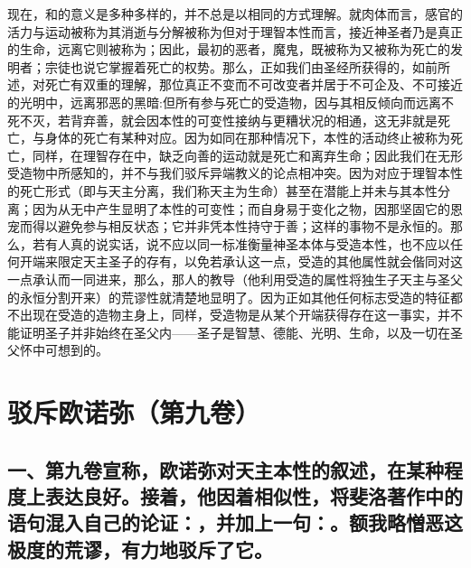 现在，和的意义是多种多样的，并不总是以相同的方式理解。就肉体而言，感官的活力与运动被称为其消逝与分解被称为但对于理智本性而言，接近神圣者乃是真正的生命，远离它则被称为；因此，最初的恶者，魔鬼，既被称为又被称为死亡的发明者；宗徒也说它掌握着死亡的权势。那么，正如我们由圣经所获得的，如前所述，对死亡有双重的理解，那位真正不变而不可改变者并居于不可企及、不可接近的光明中，远离邪恶的黑暗:但所有参与死亡的受造物，因与其相反倾向而远离不死不灭，若背弃善，就会因本性的可变性接纳与更糟状况的相通，这无非就是死亡，与身体的死亡有某种对应。因为如同在那种情况下，本性的活动终止被称为死亡，同样，在理智存在中，缺乏向善的运动就是死亡和离弃生命；因此我们在无形受造物中所感知的，并不与我们驳斥异端教义的论点相冲突。因为对应于理智本性的死亡形式（即与天主分离，我们称天主为生命）甚至在潜能上并未与其本性分离；因为从无中产生显明了本性的可变性；而自身易于变化之物，因那坚固它的恩宠而得以避免参与相反状态；它并非凭本性持守于善；这样的事物不是永恒的。那么，若有人真的说实话，说不应以同一标准衡量神圣本体与受造本性，也不应以任何开端来限定天主圣子的存有，以免若承认这一点，受造的其他属性就会偕同对这一点承认而一同进来，那么，那人的教导（他利用受造的属性将独生子天主与圣父的永恒分割开来）的荒谬性就清楚地显明了。因为正如其他任何标志受造的特征都不出现在受造的造物主身上，同样，受造物是从某个开端获得存在这一事实，并不能证明圣子并非始终在圣父内——圣子是智慧、德能、光明、生命，以及一切在圣父怀中可想到的。\par



\section{驳斥欧诺弥（第九卷）}


\subsection{一、第九卷宣称，欧诺弥对天主本性的叙述，在某种程度上表达良好。接着，他因着相似性，将斐洛著作中的语句混入自己的论证：，并加上一句：。额我略憎恶这极度的荒谬，有力地驳斥了它。}

